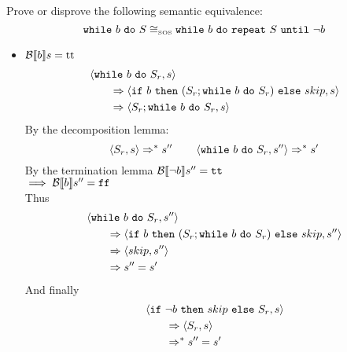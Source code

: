 \begin{exercise}{
    Prove or disprove the following semantic equivalence:
    \[ \texttt{while}\ b\ \texttt{do}\ S \cong_{\text{\tiny SOS}} \texttt{while}\ b\ \texttt{do}\ \texttt{repeat}\ S\ \texttt{until}\ \neg b  \]\vspace*{-0.6cm}
}
\begin{itemize}
\begin{itemize}
\begin{gather*}
                    \instr{\wif{\neg b}{skip}{S_r}}{s}
                    \Rightarrow
                    \instr{skip}{s}
                    \Rightarrow s
                \end{gather*}
                \item $\mathcal{B} \llbracket  b \rrbracket s = \text{tt}$
                \begin{align*}
                    &\left<\texttt{while}\ b\ \texttt{do}\ S_r, s\right>
                    \\&\qquad\Rightarrow \left<\texttt{if}\ b\ \texttt{then}\ (S_r; \texttt{while}\ b\ \texttt{do}\ S_r)\ \texttt{else}\ skip, s\right>
                    \\&\qquad\Rightarrow \left<S_r; \texttt{while}\ b\ \texttt{do}\ S_r, s\right>
                \end{align*}
                By the decomposition lemma:
                \[ \left<S_r, s\right> \Rightarrow^* s'' \qquad \left<\texttt{while}\ b\ \texttt{do}\ S_r, s''\right> \Rightarrow^* s' \]
                By the termination lemma $\mathcal{B} \llbracket  \neg b \rrbracket s'' = \texttt{tt}$ \\
                $\implies \mathcal{B} \llbracket  b \rrbracket s'' = \texttt{ff}$ \\
                Thus
                \begin{align*}
                    &\left<\texttt{while}\ b\ \texttt{do}\ S_r, s''\right>
                    \\&\qquad\Rightarrow \left<\texttt{if}\ b\ \texttt{then}\ (S_r; \texttt{while}\ b\ \texttt{do}\ S_r)\ \texttt{else}\ skip, s''\right>
                    \\&\qquad\Rightarrow \left<skip, s''\right>
                    \\&\qquad\Rightarrow s'' = s'
                \end{align*}
                And finally
                \begin{align*}
                    &\left<\texttt{if}\ \neg b\ \texttt{then}\ skip\ \texttt{else}\ S_r, s\right>
                    \\&\qquad\Rightarrow \left<S_r, s\right>
                    \\&\qquad\Rightarrow^* s'' = s'
                \end{align*}
            \end{itemize}
    \end{itemize}
\end{exercise}
